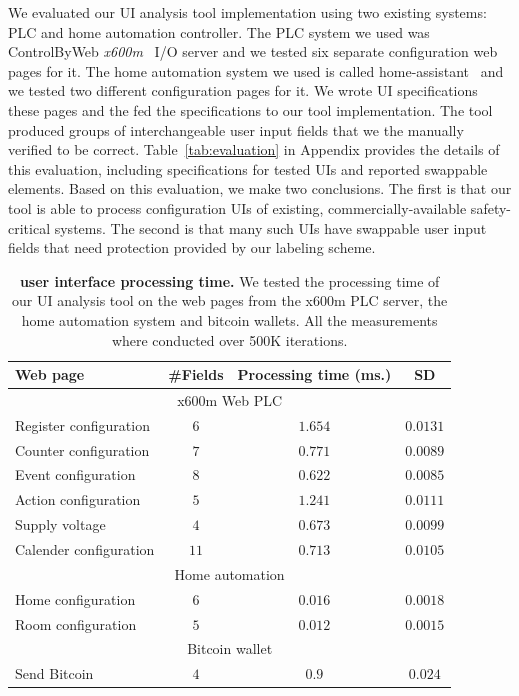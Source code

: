 We evaluated our UI analysis tool implementation using two existing systems: PLC and home automation controller. The PLC system we used was ControlByWeb \emph{x600m}~\cite{controlbyweb} I/O server and we tested six separate configuration web pages for it. The home automation system we used is called home-assistant~\cite{ha} and we tested two different configuration pages for it. We wrote UI specifications these pages and the fed the specifications to our tool implementation. The tool produced groups of interchangeable user input fields that we the manually verified to be correct. Table~\ref{tab:evaluation} in Appendix provides the details of this evaluation, including specifications for tested UIs and reported swappable elements. Based on this evaluation, we make two conclusions. The first is that our tool is able to process configuration UIs of existing, commercially-available safety-critical systems. The second is that many such UIs have swappable user input fields that need protection provided by our labeling scheme.

\begin{table}[t]
\centering
\caption{\textbf{\tool user interface processing time.} We tested the processing time of our UI analysis tool on the web pages from the x600m PLC server, the home automation system and bitcoin wallets. All the measurements where conducted over 500K iterations.}
\begin{tabular}{lccc}
\hline
\textbf{Web page} & \textbf{\#Fields} &\textbf{Processing time (ms.)} & \textbf{SD}\\ \hline
\multicolumn{4}{c}{x600m Web PLC} \\ \hline
Register configuration & $6$ & $1.654$ & $0.0131$\\ 
Counter configuration & $7$ & $0.771$ & $0.0089$\\ 
Event configuration & $8$ & $0.622$ & $0.0085$\\ 
Action configuration & $5$ & $1.241$ & $0.0111$\\ 
Supply voltage & $4$ & $0.673$ & $0.0099$\\ 
Calender configuration & $11$ & $0.713$ & $0.0105$\\ \hline
\multicolumn{4}{c}{Home automation} \\ \hline
Home configuration & $6$ & $0.016$ & $0.0018$\\ 
Room configuration & $5$ & $0.012$ & $0.0015$\\ 
\hline
\multicolumn{4}{c}{Bitcoin wallet} \\ \hline
Send Bitcoin & $4$ & $0.9$ & $0.024$\\ 
\hline
\end{tabular}


\label{tab:frameworkPerformance}
\end{table}


